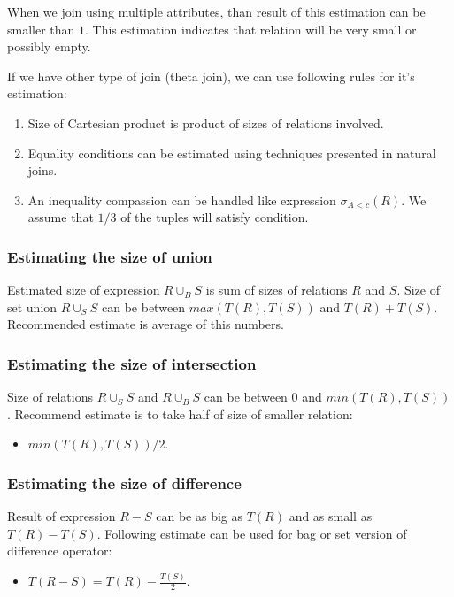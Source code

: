 When we join using multiple attributes, than result of this estimation can be smaller than $1$. This estimation indicates that relation will be very small or possibly empty.

If we have other type of join (theta join), we can use following rules for it's estimation:
\begin{enumerate}
\item Size of Cartesian product is product of sizes of relations involved.
\item Equality conditions can be estimated using techniques presented in natural joins.
\item An inequality compassion can be handled like expression $\sigma_{A<c}(R)$. We assume that $1/3$ of the tuples will satisfy condition. 
\end{enumerate}

\subsubsection{Estimating the size of union}

Estimated size of expression $R \cup_B S$ is sum of sizes of relations $R$ and $S$. Size of set union $R \cup_S S$ can be between $max(T(R),T(S))$ and $T(R)+T(S)$. Recommended estimate is average of this numbers. 

\subsubsection{Estimating the size of intersection}
Size of relations $R\cup_S S$ and $R\cup_B S$ can be between $0$ and $min(T(R),T(S))$. Recommend estimate is to take half of size of smaller relation:
\begin{itemize}
\item  $min(T(R),T(S))/2$.
\end{itemize}

\subsubsection{Estimating the size of difference}

Result of expression $R-S$ can be as big as $T(R)$ and as small as $T(R)-T(S)$. Following estimate can be used for bag or set version of difference operator: 
\begin{itemize}
\item  $T(R-S)=T(R)-\frac{T(S)}{2}$.
\end{itemize}
